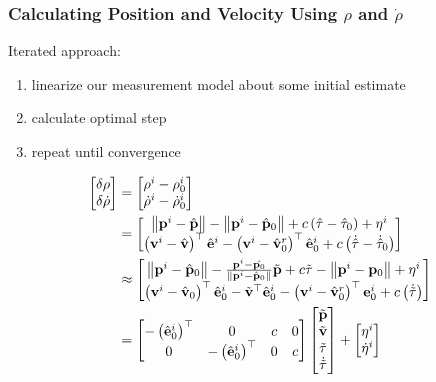 \documentclass{beamer}
\newcommand{\norm}[1]{\left\lVert#1\right\rVert}
\begin{document}
\begin{frame}\frametitle{Calculating Position and Velocity Using $\rho$ and $\dot{\rho}$}
Iterated approach:
\begin{enumerate}
	\item linearize our measurement model about some initial estimate
	\item calculate optimal step
	\item repeat until convergence
\end{enumerate}
\begin{align}
\begin{bmatrix}\delta\rho\\
\delta\dot{\rho}
\end{bmatrix} & =\begin{bmatrix}\rho^{i}-\rho{}_{0}^{i}\\
\dot{\rho}^{i}-\dot{\rho}{}_{0}^{i}
\end{bmatrix}\\
& =\begin{bmatrix}\norm{\p^{i}-\hat{\p}}-\norm{\p^{i}-\hat{\p}_{0}}+c\left(\hat{\tau}-\hat{\tau}_{0}\right)+\eta^{i}\\
\left(\v^{i}-\hat{\v}\right)^{\top}\hat{\e}^{i}-\left(\v^{i}-\hat{\v}_{0}^{r}\right)^{\top}\hat{\e}_{0}^{i}+c\left(\dot{\hat{\tau}}-\dot{\hat{\tau}}_{0}\right)
\end{bmatrix}\\
& \approx\begin{bmatrix}\norm{\p^{i}-\hat{\p}_{0}}-\frac{\p^{i}-\hat{\p_{0}}}{\norm{\p^{i}-\hat{\p}_{0}}}\tilde{\p}+c\tilde{\tau}-\norm{\p^{i}-\p_{0}}+\eta^{i}\\
\left(\v^{i}-\hat{\v}_{0}\right)^{\top}\hat{\e}_{0}^{i}-\tilde{\v}^{\top}\hat{\e}_{0}^{i}-\left(\v^{i}-\hat{\v}_{0}^{r}\right)^{\top}\e_{0}^{i}+c\left(\dot{\tilde{\tau}}\right)
\end{bmatrix}\\
& =\begin{bmatrix}-\left(\hat{\e}_{0}^{i}\right)^{\top} & 0 & c & 0\\
0 & -\left(\hat{\e}_{0}^{i}\right)^\top & 0 & c
\end{bmatrix}\begin{bmatrix}\tilde{\p}\\
\tilde{\v}\\
\tilde{\tau}\\
\dot{\tilde{\tau}}
\end{bmatrix}+\begin{bmatrix}\eta^{i}\\
\dot{\eta}^{i}
\end{bmatrix}
\end{align}
\end{frame}
\end{document}
